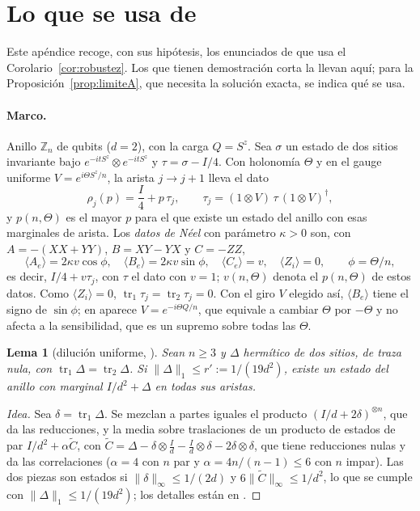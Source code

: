 \documentclass[11pt,a4paper]{article}
\newtheorem{lema}[teorema]{Lema}
\theoremstyle{remark}
\newcommand{\tr}{\operatorname{tr}}
\newcommand{\ev}[1]{\langle #1\rangle}
\begin{document}
\appendix

\section{Lo que se usa de \cite{robustez}}\label{ap:robustez}

Este apéndice recoge, con sus hipótesis, los enunciados de \cite{robustez} que usa el
Corolario~\ref{cor:robustez}. Los que tienen demostración corta la llevan aquí; para la
Proposición~\ref{prop:limiteA}, que necesita la solución exacta, se indica qué se usa.

\paragraph{Marco.} Anillo $\mathbb Z_n$ de qubits ($d=2$), con la carga $Q=S^z$. Sea $\sigma$ un
estado de dos sitios invariante bajo $e^{-itS^z}\otimes e^{-itS^z}$ y $\tau=\sigma-I/4$. Con holonomía
$\Theta$ y en el gauge uniforme $V=e^{i\Theta S^z/n}$, la arista $j\to j{+}1$ lleva el dato
\[
  \rho_j(p)=\frac I4+p\,\tau_j,\qquad\tau_j=(1\otimes V)\,\tau\,(1\otimes V)^\dagger,
\]
y $p(n,\Theta)$ es el mayor $p$ para el que existe un estado del anillo con esas marginales de arista.
Los \emph{datos de Néel} con parámetro $\kappa>0$ son, con $A=-(XX+YY)$, $B=XY-YX$ y $C=-ZZ$,
\[
  \ev{A_e}=2\kappa v\cos\phi,\quad\ev{B_e}=2\kappa v\sin\phi,\quad\ev{C_e}=v,\quad\ev{Z_i}=0,\qquad\phi=\Theta/n,
\]
es decir, $I/4+v\tau_j$, con $\tau$ el dato con $v=1$; $v(n,\Theta)$ denota el $p(n,\Theta)$ de estos datos.
Como $\ev{Z_i}=0$, $\tr_1\tau_j=\tr_2\tau_j=0$. Con el giro $V$ elegido así, $\ev{B_e}$ tiene el signo de
$\sin\phi$; en \cite{robustez} aparece $V=e^{-i\Theta Q/n}$, que equivale a cambiar $\Theta$ por $-\Theta$ y no
afecta a la sensibilidad, que es un supremo sobre todas las $\Theta$.

\begin{lema}[dilución uniforme, {\cite[Lema~2]{robustez}}]\label{lem:dilucionA}
Sean $n\ge3$ y $\Delta$ hermítico de dos sitios, de traza nula, con $\tr_1\Delta=\tr_2\Delta$. Si
$\|\Delta\|_1\le r':=1/(19d^2)$, existe un estado del anillo con marginal $I/d^2+\Delta$ en todas sus
aristas.
\end{lema}

\begin{proof}[Idea]
Sea $\delta=\tr_1\Delta$. Se mezclan a partes iguales el producto $(I/d+2\delta)^{\otimes n}$, que da las
reducciones, y la media sobre traslaciones de un producto de estados de par $I/d^2+\alpha\tilde C$, con
$\tilde C=\Delta-\delta\otimes\tfrac Id-\tfrac Id\otimes\delta-2\delta\otimes\delta$, que tiene reducciones nulas
y da las correlaciones ($\alpha=4$ con $n$ par y $\alpha=4n/(n-1)\le6$ con $n$ impar). Las dos piezas son estados si
$\|\delta\|_\infty\le1/(2d)$ y $6\|\tilde C\|_\infty\le1/d^2$, lo que se cumple con
$\|\Delta\|_1\le1/(19d^2)$; los detalles están en \cite[Lema~2]{robustez}.
\end{proof}
\end{document}
